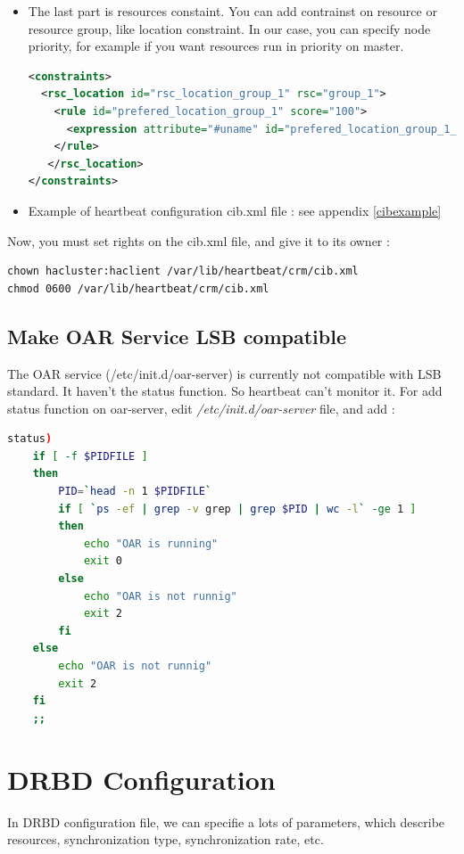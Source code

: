 \documentclass[a4paper,10pt]{report}
\begin{document}
\begin{itemize}
\begin{itemize}
\end{itemize}

\item The last part is resources constaint. You can add contrainst on resource or resource group, like location constraint.
In our case, you can specify node priority, for example if you want resources run in priority on master.
\begin{lstlisting}[language=xml]
<constraints>
  <rsc_location id="rsc_location_group_1" rsc="group_1">
    <rule id="prefered_location_group_1" score="100">
      <expression attribute="#uname" id="prefered_location_group_1_expr" operation="eq" value="NODE-NAME"/>
    </rule>
   </rsc_location>
</constraints>
\end{lstlisting}

\item Example of heartbeat configuration cib.xml file : see appendix \ref{cibexample}


\end{itemize}

Now, you must set rights on the cib.xml file, and give it to its owner :
\begin{lstlisting}
chown hacluster:haclient /var/lib/heartbeat/crm/cib.xml
chmod 0600 /var/lib/heartbeat/crm/cib.xml
\end{lstlisting}




\subsection{Make OAR Service LSB compatible}
The OAR service (/etc/init.d/oar-server) is currently not compatible with LSB standard. It haven't the status function. So heartbeat can't monitor it.
For add status function on oar-server, edit \textit{/etc/init.d/oar-server} file, and add :
\begin{lstlisting}[language=bash]
status)
	if [ -f $PIDFILE ]
	then
		PID=`head -n 1 $PIDFILE`
		if [ `ps -ef | grep -v grep | grep $PID | wc -l` -ge 1 ]
		then
			echo "OAR is running"
			exit 0
		else
			echo "OAR is not runnig"
			exit 2
		fi
	else
		echo "OAR is not runnig"
		exit 2
	fi
	;;
\end{lstlisting}


\section{DRBD Configuration}
In DRBD configuration file, we can specifie a lots of parameters, which describe resources, synchronization type, synchronization rate, etc.
\end{document}
